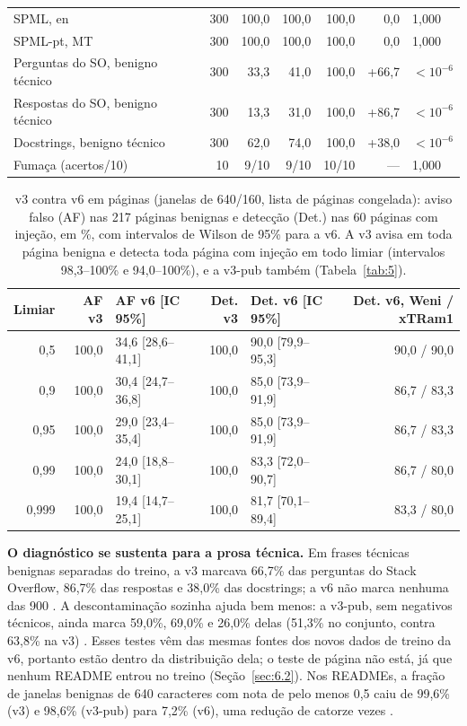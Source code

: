 \documentclass[11pt]{article}
\begin{document}
\begin{table}[tbp]
\begin{tabularx}{\linewidth}{@{}>{\raggedright\arraybackslash\hsize=1.00\hsize}Xrrrrrl@{}}
SPML, en & 300 & 100,0 & 100,0 & 100,0 & 0,0 & 1,000 \\
SPML-pt, MT & 300 & 100,0 & 100,0 & 100,0 & 0,0 & 1,000 \\
Perguntas do SO, benigno técnico & 300 & 33,3 & 41,0 & 100,0 & +66,7 & $<10^{-6}$ \\
Respostas do SO, benigno técnico & 300 & 13,3 & 31,0 & 100,0 & +86,7 & $<10^{-6}$ \\
Docstrings, benigno técnico & 300 & 62,0 & 74,0 & 100,0 & +38,0 & $<10^{-6}$ \\
Fumaça (acertos/10) & 10 & 9/10 & 9/10 & 10/10 & — & 1,000 %
 \\
\bottomrule
\end{tabularx}
\end{table}

\begin{table}[tbp]
\centering
\small
\caption{v3 contra v6 em páginas (janelas de 640/160, lista de páginas congelada): aviso falso (AF) nas 217 páginas benignas e detecção (Det.) nas 60 páginas com injeção, em \%, com intervalos de Wilson de 95\% para a v6. A v3 avisa em toda página benigna e detecta toda página com injeção em todo limiar (intervalos 98,3–100\% e 94,0–100\%), e a v3-pub também (Tabela~\ref{tab:5}).}\label{tab:11}
\begin{tabular}{@{}rrlrlr@{}}
\toprule
Limiar & AF v3 & AF v6 [IC 95\%] & Det. v3 & Det. v6 [IC 95\%] & Det. v6, Weni / xTRam1 \\
\midrule
0,5 & 100,0 & 34,6 [28,6–41,1] & 100,0 & 90,0 [79,9–95,3] & 90,0 / 90,0 \\
0,9 & 100,0 & 30,4 [24,7–36,8] & 100,0 & 85,0 [73,9–91,9] & 86,7 / 83,3 \\
0,95 & 100,0 & 29,0 [23,4–35,4] & 100,0 & 85,0 [73,9–91,9] & 86,7 / 83,3 \\
0,99 & 100,0 & 24,0 [18,8–30,1] & 100,0 & 83,3 [72,0–90,7] & 86,7 / 80,0 \\
0,999 & 100,0 & 19,4 [14,7–25,1] & 100,0 & 81,7 [70,1–89,4] & 83,3 / 80,0 %
 \\
\bottomrule
\end{tabular}
\end{table}

\textbf{O diagnóstico se sustenta para a prosa técnica.} Em frases técnicas benignas separadas do treino, a v3 marcava 66,7\% das perguntas do Stack Overflow, 86,7\% das respostas e 38,0\% das docstrings; a v6 não marca nenhuma das 900%
. A descontaminação sozinha ajuda bem menos: a v3-pub, sem negativos técnicos, ainda marca 59,0\%, 69,0\% e 26,0\% delas (51,3\% no conjunto, contra 63,8\% na v3)%
. Esses testes vêm das mesmas fontes dos novos dados de treino da v6, portanto estão dentro da distribuição dela; o teste de página não está, já que nenhum README entrou no treino (Seção~\ref{sec:6.2}). Nos READMEs, a fração de janelas benignas de 640 caracteres com nota de pelo menos 0,5 caiu de 99,6\% (v3) e 98,6\% (v3-pub) para 7,2\% (v6), uma redução de catorze vezes%
.
\end{document}
